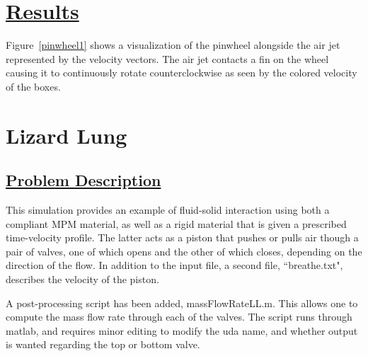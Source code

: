 \newpage

\section*{\underline{Results}}

\begin{figure}
  \centering
  \vspace{-40pt}
  \hspace{10pt}
  \caption{}
  \label{}

\end{figure}

Figure~\ref{pinwheel1} shows a visualization of the pinwheel alongside the air jet represented by the velocity vectors. The air jet contacts a fin on the wheel causing it to continuously rotate counterclockwise as seen by the colored velocity of the boxes.  

\fi      

\newpage
\section*{\center  Lizard Lung}
\subsection*{\underline{Problem Description}}
This simulation provides an example of fluid-solid interaction using both a
compliant MPM material, as well as a rigid material that is given a prescribed
time-velocity profile.  The latter acts as a piston that pushes or pulls air
though a pair of valves, one of which opens and the other of which closes,
depending on the direction of the flow.  In addition to the input file, a
second file, ``breathe.txt", describes the velocity of the piston.

A post-processing script has been added, massFlowRateLL.m.  This allows one to 
compute the mass flow rate through each of the valves.  The script runs through
matlab, and requires minor editing to modify the uda name, and whether output is
wanted regarding the top or bottom valve.

